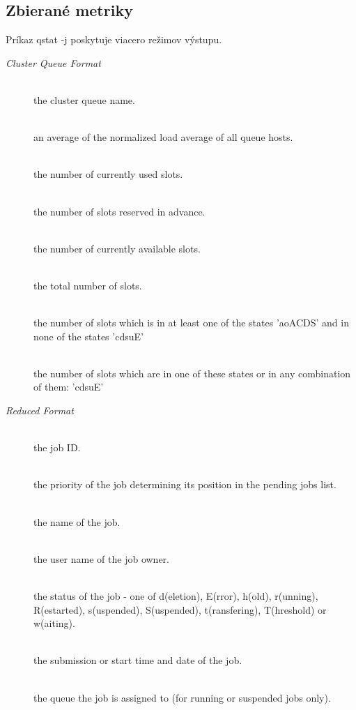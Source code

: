 \documentclass[11pt,final,oneside]{fithesis}
\begin{document}
\subsection{Zbierané metriky}
Príkaz qstat -j poskytuje viacero režimov výstupu.
\begin{description}
\item[\emph{Cluster Queue Format}]
		\\the cluster queue name.

     \\ an average of the normalized load average  of  all  queue
        hosts.  

    \\  the number of currently used slots.

     \\  the number of slots reserved in advance.

     \\  the number of currently available slots.

    \\  the total number of slots.

     \\  the number of slots which is  in  at  least  one  of  the
        states  'aoACDS' and in none of the states 'cdsuE'

     \\ the number of slots which are in one of these  states  or
        in any  combination of them: 'cdsuE'

\item[\emph{Reduced Format}]
	\\the job ID.

     \\ the priority of the job determining its position  in  the
        pending  jobs  list. 

    \\  the name of the job.

     \\  the user name of the job owner.

     \\ the status of the  job  -  one  of  d(eletion),  E(rror),
        h(old), r(unning), R(estarted), s(uspended), S(uspended),
        t(ransfering), T(hreshold) or w(aiting).

     \\  the submission or start time and date of the job.

     \\  the  queue  the  job  is  assigned  to  (for  running  or
        suspended jobs only).


\end{description}
\end{document}
